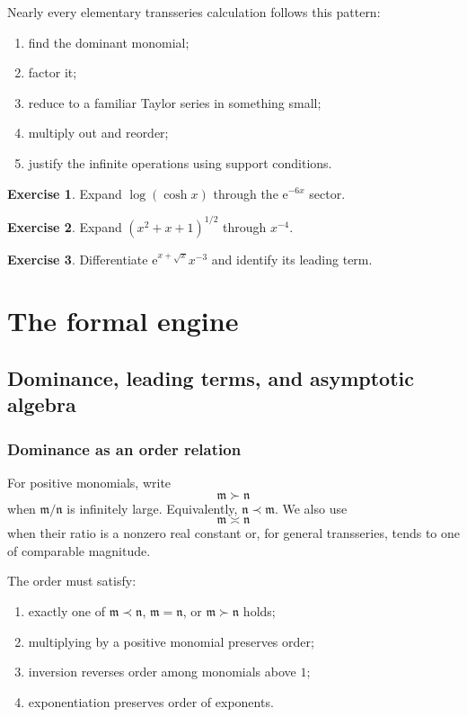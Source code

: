 \documentclass[11pt,oneside,openany]{book}
\newcommand{\e}{\mathrm{e}}
\newcommand{\mon}{\mathfrak{m}}
\newcommand{\nmon}{\mathfrak{n}}
\theoremstyle{plain}
\theoremstyle{definition}
\newtheorem{exercise}{Exercise}[chapter]
\theoremstyle{remark}
\begin{document}
\begin{checkpoint}
Nearly every elementary transseries calculation follows this pattern:
\begin{enumerate}
  \item find the dominant monomial;
  \item factor it;
  \item reduce to a familiar Taylor series in something small;
  \item multiply out and reorder;
  \item justify the infinite operations using support conditions.
\end{enumerate}
\end{checkpoint}

\begin{exercise}
Expand $\log(\cosh x)$ through the $\e^{-6x}$ sector.
\end{exercise}

\begin{exercise}
Expand $(x^2+x+1)^{1/2}$ through $x^{-4}$.
\end{exercise}

\begin{exercise}
Differentiate $\e^{x+\sqrt{x}}x^{-3}$ and identify its leading term.
\end{exercise}


\part{The formal engine}

\chapter{Dominance, leading terms, and asymptotic algebra}
\label{ch:dominance}

\section{Dominance as an order relation}
For positive monomials, write
\[
  \mon\succ\nmon
\]
when $\mon/\nmon$ is infinitely large. Equivalently, $\nmon\prec\mon$. We also use
\[
  \mon\asymp\nmon
\]
when their ratio is a nonzero real constant or, for general transseries, tends to one of comparable magnitude.

The order must satisfy:
\begin{enumerate}
  \item exactly one of $\mon\prec\nmon$, $\mon=\nmon$, or $\mon\succ\nmon$ holds;
  \item multiplying by a positive monomial preserves order;
  \item inversion reverses order among monomials above $1$;
  \item exponentiation preserves order of exponents.
\end{enumerate}
\end{document}
